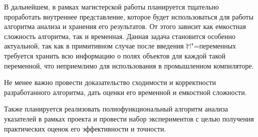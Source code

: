 \documentclass[14pt,titlepage,draft]{extarticle}
\newcommand{\M}{\ensuremath{\mathbb{M}}}
\begin{document}

    В дальнейшем, в рамках магистерской работы планируется тщательно
    проработать внутреннее представление, которое будет использоваться для
    работы алгоритма анализа и хранения его результатов. От этого зависит как
    емкостная сложность алгоритма, так и временная. Данная задача становится
    особенно актуальной, так как в примитивном случае после введения
    \M"=переменных требуется хранить всю информацию о полях объектов для каждой
    такой переменной, что неприемлимо для использования в промышленном
    компиляторе.

    Не менее важно провести доказательство сходимости и корректности
    разработанного алгоритма, дать оценки его временной и емкостной сложности.

    Также планируется реализовать полнофункциональный алгоритм анализа
    указателей в рамках проекта  и провести набор
    экспериментов с целью получения практических оценок его эффективности и
    точности.


  \newpage
  
  
\end{document}
